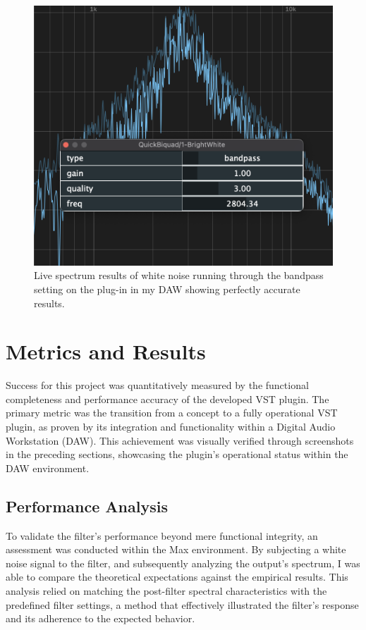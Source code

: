 \documentclass[10pt,twocolumn]{article}
\begin{document}
\begin{figure}[htbp]
  \centering
  \includegraphics[width=0.8\linewidth]{bandpass2.png}
  \caption{Live spectrum results of white noise running through the bandpass setting on the plug-in in my DAW showing perfectly accurate results.}
  \label{fig:results}
\end{figure}

\section{Metrics and Results}

Success for this project was quantitatively measured by the functional completeness and performance accuracy of the developed VST plugin. The primary metric was the transition from a concept to a fully operational VST plugin, as proven by its integration and functionality within a Digital Audio Workstation (DAW). This achievement was visually verified through screenshots in the preceding sections, showcasing the plugin's operational status within the DAW environment.

\subsection{Performance Analysis}
To validate the filter's performance beyond mere functional integrity, an assessment was conducted within the Max environment. By subjecting a white noise signal to the filter, and subsequently analyzing the output's spectrum, I was able to compare the theoretical expectations against the empirical results. This analysis relied on matching the post-filter spectral characteristics with the predefined filter settings, a method that effectively illustrated the filter's response and its adherence to the expected behavior\cite{Jackson}.
\end{document}

